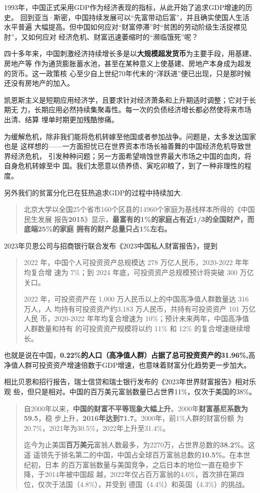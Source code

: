 1993年，中国正式采用GDP作为经济表现的指标，从此开始了追求GDP增速的历史。
回到亚当·斯密，中国持续发展可以“先富带动后富”，并且确实使国人生活水平普遍
大幅提高。但中国如何应对“财富停滞”时“贫困的劳动阶级生活捉襟见肘”，又如何应对
经济危机、财富迅速萎缩时的“濒临饿死”呢？

四十多年来，中国刺激经济持续增长多是以\textbf{大规模超发货币}为主要手段，用基建、房地产等
作为通货膨胀蓄水池，甚至在某种意义上使基建、房地产本身成为超发的货币。这一政策核
心至少自上世纪70年代末的“洋跃进”便已出现，只是那时候还没有房地产的加入。

凯恩斯主义是短期应用经济学，且要求针对经济萧条和上升期适时调整；它对于长期无
力，长期应用必然持续集聚毒性。每一次的负债经济增长都必然使将来市场出清、结算
埋单时期更加残酷惨痛。

为缓解危机，除非我们能将危机转嫁至他国或者参加战争。问题是，太多发达国家也是
这样想的——一方面担忧已在世界资本市场长袖善舞的中国经济危机导致世界经济危机，
引发种种问题；另一方面希望啃蚀世界最大市场之中国的血肉，将自身危机转嫁至中
国。我们太愿意以债养债、寅吃卯粮了，到了一种非理性的程度。

另外我们的贫富分化已在狂热追求GDP的过程中持续加大.

\begin{quotation}
  北京大学以全国25个省市160个区县的14960个家庭为基线样本所得的《中国民生发展
  报告\textbf{2015}》显示，\textbf{最富有的1\%的家庭占有近1/3的全国财产，而底端25\%的家庭
    拥有的财产总量只占1\%左右。}\cite{dajueqi}
\end{quotation}

2023年贝恩公司与招商银行联合发布《2023中国私人财富报告》，提到
\begin{quotation}
  2022 年，中国个人可投资资产总规模达 278 万亿人民币，2020-2022 年年均复合增
  速为 7\%；到 2024 年底，可投资资产总规模预计将突破 300 万亿关口。

  2022 年，可投资资产在 1,000 万人民币以上的中国高净值人群数量达 316 万人，人
  均持有可投资资产约3,183 万人民币，共持有可投资资产 101 万亿人民
  币，2020-2022 年年均复合增速为 10\%；预计未来两年，中国高净值人群数量和持有
  的可投资资产规模将以约 11\% 和 12\% 的复合增速继续增长。
\end{quotation}
也就是说在中国，\textbf{0.22\%的人口（高净值人群）占据了总可投资资产的31.96\%,}高
净值人群可投资资产增速倍数于GDP增速，也意味着财富分化趋势更一步加大。

相比贝恩和招行报告，瑞士信贷和瑞士银行发布的《2023年世界财富报告》相对乐观
些，但只是相对。中国的百万美元富翁数量已占世界11\%，仅次于美国的38\%。
\begin{quotation}
  自2000年以来，\textbf{中国的财富不平等现象大幅上升}。2000年\textbf{财富基尼系数为59.5}，稳
  步上升，\textbf{2016年达到71.7}。2000年，前1\%人群的财富份额
  为20.7\%，2021年为30.5\%，2022年上升至31.4\%。

  迄今为止美国\textbf{百万美元}富翁人数最多，为2270万，占世界总数的\textbf{38.2\%}。这遥
  遥领先于排名第二的中国，中国占全球百万富翁总数的\textbf{10.5\%}。在本世纪初，日本
  的百万富翁数量与美国竞争，之后日本的地位一直在稳步下降，于2014年被中国超
  越，2022年仅占百万富翁的4.6\%，首次排在第四位，仅次于法国（4.8\%），并受到
  德国（4.4\%）和英国（4.3\%）的挑战。
\end{quotation}

